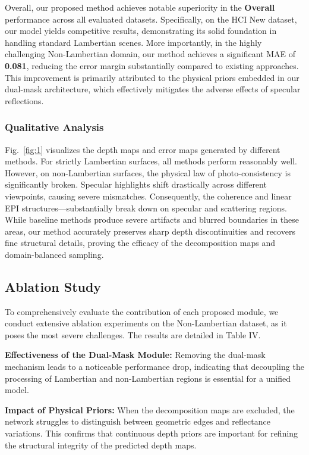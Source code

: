 \documentclass[lettersize,journal]{IEEEtran}
\begin{document}
Overall, our proposed method achieves notable superiority in the \textbf{Overall} performance across all evaluated datasets. Specifically, on the HCI New dataset, our model yields competitive results, demonstrating its solid foundation in handling standard Lambertian scenes. More importantly, in the highly challenging Non-Lambertian domain, our method achieves a significant MAE of \textbf{0.081}, reducing the error margin substantially compared to existing approaches. This improvement is primarily attributed to the physical priors embedded in our dual-mask architecture, which effectively mitigates the adverse effects of specular reflections.

\subsubsection{Qualitative Analysis}
Fig.~\ref{fig:1} visualizes the depth maps and error maps generated by different methods. For strictly Lambertian surfaces, all methods perform reasonably well. However, on non-Lambertian surfaces, the physical law of photo-consistency is significantly broken. Specular highlights shift drastically across different viewpoints, causing severe mismatches. Consequently, the coherence and linear EPI structures---substantially break down on specular and scattering regions. While baseline methods produce severe artifacts and blurred boundaries in these areas, our method accurately preserves sharp depth discontinuities and recovers fine structural details, proving the efficacy of the decomposition maps and domain-balanced sampling.

\subsection{Ablation Study}

To comprehensively evaluate the contribution of each proposed module, we conduct extensive ablation experiments on the Non-Lambertian dataset, as it poses the most severe challenges. The results are detailed in Table IV.

\textbf{Effectiveness of the Dual-Mask Module:} 
Removing the dual-mask mechanism leads to a noticeable performance drop, indicating that decoupling the processing of Lambertian and non-Lambertian regions is essential for a unified model. 

\textbf{Impact of Physical Priors:} 
When the decomposition maps are excluded, the network struggles to distinguish between geometric edges and reflectance variations. This confirms that continuous depth priors are important for refining the structural integrity of the predicted depth maps.
\end{document}
